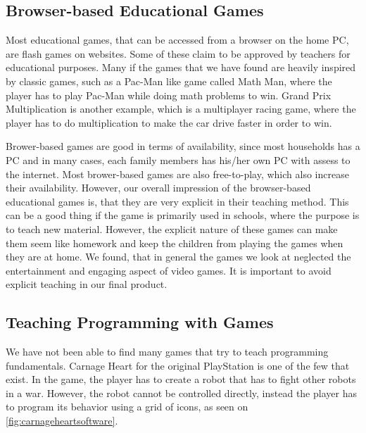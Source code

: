 \subsection{Browser-based Educational Games}
Most educational games, that can be accessed from a browser on the home PC, are flash games on websites. Some of these claim to be approved by teachers for educational purposes.
Many if the games that we have found are heavily inspired by classic games, such as a Pac-Man like game called Math Man, where the player has to play Pac-Man while doing math problems to win.\cite{mathman}
Grand Prix Multiplication is another example, which is a multiplayer racing game, where the player has to do multiplication to make the car drive faster in order to win.\cite{grandprix}\newline

Brower-based games are good in terms of availability, since most households has a PC and in many cases, each family members has his/her own PC with assess to the internet. Most brower-based games are also free-to-play, which also increase their availability. However, our overall impression of the browser-based educational games is, that they are very explicit in their teaching method. This can be a good thing if the game is primarily used in schools, where the purpose is to teach new material. However, the explicit nature of these games can make them seem like homework and keep the children from playing the games when they are at home. We found, that in general the games we look at neglected the entertainment and engaging aspect of video games. It is important to avoid explicit teaching in our final product.\newline


\subsection{Teaching Programming with Games}
We have not been able to find many games that try to teach programming fundamentals. Carnage Heart for the original PlayStation is one of the few that exist. In the game, the player has to create a robot that has to fight other robots in a war. However, the robot cannot be controlled directly, instead the player has to program its behavior using a grid of icons, as seen on \autoref{fig:carnageheartsoftware}.

